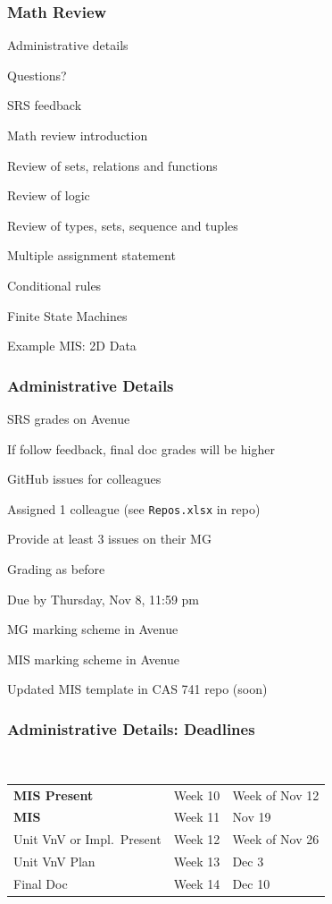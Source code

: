 \documentclass[t,12pt,numbers,fleqn]{beamer}
\begin{document}



\begin{frame}
\frametitle{Math Review}

\bi
\item Administrative details
\item Questions?
\item SRS feedback
\item Math review introduction
\item Review of sets, relations and functions
\item Review of logic
\item Review of types, sets, sequence and tuples
\item Multiple assignment statement
\item Conditional rules
\item Finite State Machines
\item Example MIS: 2D Data
\ei
\end{frame}


\begin{frame}
\frametitle{Administrative Details}

\bi
\item SRS grades on Avenue
\item If follow feedback, final doc grades will be higher
\item GitHub issues for colleagues
\bi
\item Assigned 1 colleague (see \texttt{Repos.xlsx} in repo)
\item Provide at least 3 issues on their MG
\item Grading as before
\item Due by Thursday, Nov 8, 11:59 pm
\ei
\item MG marking scheme in Avenue
\item MIS marking scheme in Avenue
\item Updated MIS template in CAS 741 repo (soon)
\ei

\end{frame}


\begin{frame}
\frametitle{Administrative Details: Deadlines}
~\newline
\begin{tabular}{l l l}
\textbf{MIS Present} & Week 10 & Week of Nov 12\\
\textbf{MIS} & Week 11 & Nov 19\\
Unit VnV or Impl.\ Present & Week 12 & Week of Nov 26\\
Unit VnV Plan & Week 13 & Dec 3\\
Final Doc & Week 14 & Dec 10\\
\end {tabular}

\end{frame}
\end{document}
